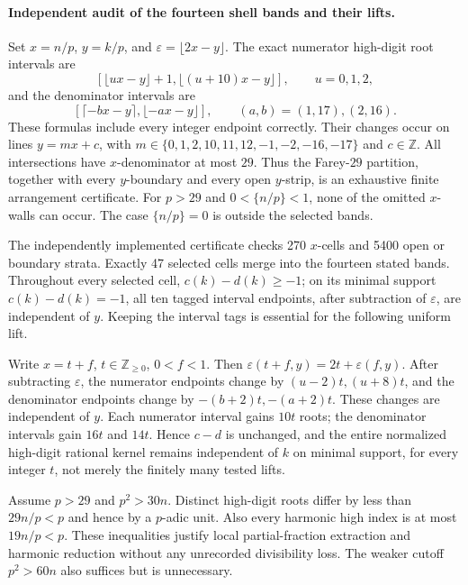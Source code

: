 \paragraph{Independent audit of the fourteen shell bands and their lifts.}
Set $x=n/p$, $y=k/p$, and $\varepsilon=\lfloor2x-y\rfloor$.
The exact numerator high-digit root intervals are
\[
 [\lfloor ux-y\rfloor+1,\lfloor(u+10)x-y\rfloor],\qquad u=0,1,2,
\]
and the denominator intervals are
\[
 [\lceil-bx-y\rceil,\lfloor-ax-y\rfloor],
 \qquad(a,b)=(1,17),(2,16).
\]
These formulas include every integer endpoint correctly. Their changes occur
on lines $y=mx+c$, with
$m\in\{0,1,2,10,11,12,-1,-2,-16,-17\}$ and $c\in\mathbb Z$.
All intersections have $x$-denominator at most $29$. Thus the Farey-$29$
partition, together with every $y$-boundary and every open $y$-strip,
is an exhaustive finite arrangement certificate. For $p>29$ and
$0<\{n/p\}<1$, none of the omitted $x$-walls can occur.
The case $\{n/p\}=0$ is outside the selected bands.

The independently implemented certificate checks 270 $x$-cells and
5400 open or boundary strata. Exactly 47 selected cells merge into the
fourteen stated bands. Throughout every selected cell, $c(k)-d(k)\ge-1$;
on its minimal support $c(k)-d(k)=-1$, all ten tagged interval endpoints,
after subtraction of $\varepsilon$, are independent of $y$.
Keeping the interval tags is essential for the following uniform lift.

Write $x=t+f$, $t\in\mathbb Z_{\ge0}$, $0<f<1$. Then
$\varepsilon(t+f,y)=2t+\varepsilon(f,y)$. After subtracting $\varepsilon$,
the numerator endpoints change by $(u-2)t,(u+8)t$, and the denominator
endpoints change by $-(b+2)t,-(a+2)t$. These changes are independent of
$y$. Each numerator interval gains $10t$ roots; the denominator intervals
gain $16t$ and $14t$. Hence $c-d$ is unchanged, and the entire normalized
high-digit rational kernel remains independent of $k$ on minimal support,
for every integer $t$, not merely the finitely many tested lifts.

Assume $p>29$ and $p^2>30n$. Distinct high-digit roots differ by less than
$29n/p<p$ and hence by a $p$-adic unit. Also every harmonic high index is
at most $19n/p<p$. These inequalities justify local partial-fraction
extraction and harmonic reduction without any unrecorded divisibility loss.
The weaker cutoff $p^2>60n$ also suffices but is unnecessary.

